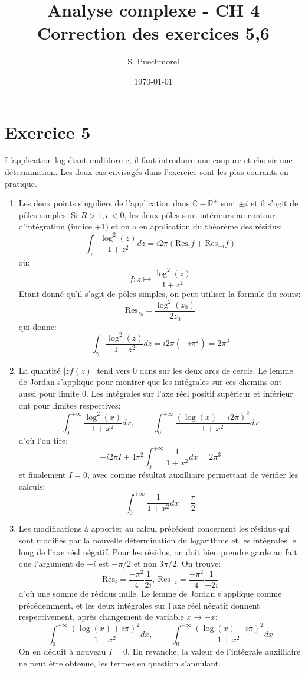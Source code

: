 \documentclass[a4paper,12pt]{amsart}
\title{Analyse complexe - CH 4\\ Correction des exercices 5,6}
\author{S. Puechmorel}
\date{\today}
\theoremstyle{plain}
\theoremstyle{definition}
\theoremstyle{remark}
\begin{document}
\maketitle
\section*{Exercice 5}
L'application log étant multiforme, il faut introduire une coupure et choisir une détermination. Les deux cas 
envisagés dans l'exercice sont les plus courants en pratique.
\begin{enumerate}
\item Les deux points singuliers de l'application dans $\mathbb{C}-\mathbb{R}^+$ sont $\pm i$ et il s'agit de pôles simples. 
Si $R > 1, \epsilon< 0$, les deux pôles sont intérieurs au contour d'intégration (indice +1) et on a en application du théorème des
résidus:
\[
\int_{\gamma}\frac{\log^2(z)}{1+z^2}dz = i 2 \pi \left( \text{Res}_{i}f + \text{Res}_{-i}f\right)
\]
où:
\[
f \colon  z \mapsto \frac{\log^2(z)}{1+z^2}
\]
Etant donné qu'il s'agit de pôles simples, on peut utiliser la formule du cours:
\[
\text{Res}_{z_0}=\frac{\log^2(z_0)}{2z_0}
\]
qui donne:
\[
\int_{\gamma}\frac{\log^2(z)}{1+z^2}dz = i 2 \pi (-i \pi^2) = 2 \pi^3
\]
\item La quantité $|zf(z)|$ tend vers 0 dans sur les deux arcs de cercle. Le lemme de Jordan s'applique pour 
montrer que les intégrales sur ces chemins ont aussi pour limite 0. Les intégrales sur l'axe réel
positif supérieur et inférieur 
ont pour limites respectives:
\[
\int_0^{+\infty} \frac{\log^2(x)}{1+x^2}dx , \quad -\int_0^{+\infty} \frac{\left(\log(x)+i2\pi\right)^2}{1+x^2}dx
\]
d'où l'on tire:
\[
-i 2\pi I + 4 \pi^2 \int_0^{+\infty} \frac{1}{1+x^2}dx = 2 \pi^3
\]
et finalement $I=0$, avec comme résultat auxilliaire permettant de vérifier les calculs:
\[
\int_0^{+\infty} \frac{1}{1+x^2}dx = \frac{\pi}{2}
\]
\item Les modifications à apporter au calcul précédent concernent les résidus qui sont modifiés
par la nouvelle détermination du logarithme et les intégrales le long de l'axe réel négatif.
Pour les résidus, on doit bien prendre garde au fait que l'argument de $-i$ est $-\pi/2$ et non $3\pi/2$. On trouve:
\[
\text{Res}_{i}= \frac{- \pi^2}{4}\frac{1}{2i}, \, \text{Res}_{-i}= \frac{- \pi^2}{4}\frac{1}{-2i}
\]
d'où une somme de résidus nulle.
Le lemme de Jordan s'applique comme précédemment, et les deux intégrales sur l'axe réel négatif 
donnent respectivement, après changement de variable $x \to -x$:
\[
\int_0^{+\infty} \frac{\left(\log(x)+i\pi\right)^2}{1+x^2}dx , \quad -\int_0^{+\infty} \frac{\left(\log(x)-i\pi\right)^2}{1+x^2}dx
\]
On en déduit à nouveau $I=0$. En revanche, la valeur de l'intégrale auxilliaire ne peut être obtenue,
les termes en question s'annulant.
\end{enumerate}
\end{document}
